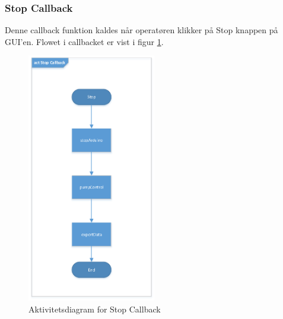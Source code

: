 \subsubsection{Stop Callback}
Denne callback funktion kaldes når operatøren klikker på Stop knappen på GUI'en. Flowet i callbacket er vist i figur \ref{fig:act_stop}.
\begin{figure}[H]
	\centering
	\includegraphics[width=0.5\textwidth]{billeder/act_stop-crop.pdf}
	\caption{Aktivitetsdiagram for Stop Callback}
	\label{fig:act_stop}
\end{figure}

\newpage
